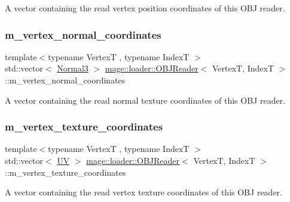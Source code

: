 A vector containing the read vertex position coordinates of this O\+BJ reader. \hypertarget{classmage_1_1loader_1_1_o_b_j_reader_a344094087b3f0978c599970e35f77aac}{}\label{classmage_1_1loader_1_1_o_b_j_reader_a344094087b3f0978c599970e35f77aac} 
\subsubsection{\texorpdfstring{m\+\_\+vertex\+\_\+normal\+\_\+coordinates}{m\_vertex\_normal\_coordinates}}
{\footnotesize\ttfamily template$<$typename VertexT , typename IndexT $>$ \\
std\+::vector$<$ \hyperlink{structmage_1_1_normal3}{Normal3} $>$ \hyperlink{classmage_1_1loader_1_1_o_b_j_reader}{mage\+::loader\+::\+O\+B\+J\+Reader}$<$ VertexT, IndexT $>$\+::m\+\_\+vertex\+\_\+normal\+\_\+coordinates\hspace{0.3cm}{\ttfamily [private]}}

A vector containing the read normal texture coordinates of this O\+BJ reader. \hypertarget{classmage_1_1loader_1_1_o_b_j_reader_a9025e0039c3c4d7e25bf40dc0f4431c0}{}\label{classmage_1_1loader_1_1_o_b_j_reader_a9025e0039c3c4d7e25bf40dc0f4431c0} 
\subsubsection{\texorpdfstring{m\+\_\+vertex\+\_\+texture\+\_\+coordinates}{m\_vertex\_texture\_coordinates}}
{\footnotesize\ttfamily template$<$typename VertexT , typename IndexT $>$ \\
std\+::vector$<$ \hyperlink{structmage_1_1_u_v}{UV} $>$ \hyperlink{classmage_1_1loader_1_1_o_b_j_reader}{mage\+::loader\+::\+O\+B\+J\+Reader}$<$ VertexT, IndexT $>$\+::m\+\_\+vertex\+\_\+texture\+\_\+coordinates\hspace{0.3cm}{\ttfamily [private]}}

A vector containing the read vertex texture coordinates of this O\+BJ reader. 